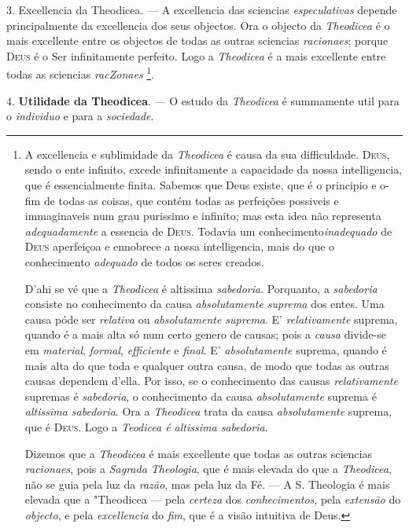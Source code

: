 3. Excellencia da Theodicea. --- A excellencia das sciencias \emph{especulativas} depende principalmente da excellencia dos seus objectos. Ora o objecto da \emph{Theodicea} é o mais excellente entre os objectos de todas as outras sciencias \emph{racionaes}; porque \textsc{Deus} é o Ser infinitamente perfeito. Logo a \emph{Theodicea} é a mais excellente entre todas as sciencias \emph{racZonaes} \footnote{A excellencia e sublimidade da \emph{Theodicea} é causa da sua difficuldade. \textsc{Deus}, sendo o ente infinito, excede infinitamente a capacidade da nossa intelligencia, que é essencialmente finita. Sabemos que Deus existe, que é o principio e o-fim de todas as coisas, que contém todas as perfeições possiveis e immaginaveis num grau purissimo e infinito; mas esta idea não representa \emph{adequadamente} a essencia de \textsc{Deus}. Todavia um conhecimento\emph{inadequado} de \textsc{Deus} aperfeiçoa e ennobrece a nossa intelligencia, mais do que o conhecimento \emph{adequado} de todos os seres creados.\par D'ahi se vé que a \emph{Theodicea} é altissima \emph{sabedoria}. Porquanto, a \emph{sabedoria} consiste no conhecimento da causa \emph{absolutamente suprema} dos entes. Uma causa póde ser \emph{relativa} ou \emph{absolutamente suprema}. E' \emph{relativamente} suprema, quando é a mais alta só num certo genero de causas; pois a \emph{causa} divide-se em \emph{material}, \emph{formal}, \emph{efficiente} e \emph{final}. E' \emph{absolutamente} suprema, quando é mais alta do que toda e qualquer outra causa, de modo que todas as outras causas dependem d'ella. Por isso, se o conhecimento das causas \emph{relativamente} supremas é \emph{sabedoria}, o conhecimento da causa \emph{absolutamente} suprema é \emph{altissima sabedoria}. Ora a \emph{Theodicea} trata da causa \emph{absolutamente} suprema, que é \textsc{Deus}. Logo a \emph{Teodicea é altissima sabedoria}.\par Dizemos que a \emph{Theodicea} é mais excellente que todas as outras sciencias \emph{racionaes}, pois a \emph{Sagrada Theologia}, que é mais elevada do que a \emph{Theodicea}, não se guia pela luz da \emph{razão}, mas pela luz da Fé. --- A S. Theologia é mais elevada que a "Theodicea --- pela \emph{certeza} dos \emph{conhecimentos}, pela \emph{extensão} do \emph{objecto}, e pela \emph{excellencia} do \emph{fim}, que é a visão intuitiva de Deus.}.

 4. \textbf{Utilidade da Theodicea}. --- O estudo da \emph{Theodicea} é summamente util para o \emph{individuo} e para a \emph{sociedade}.

